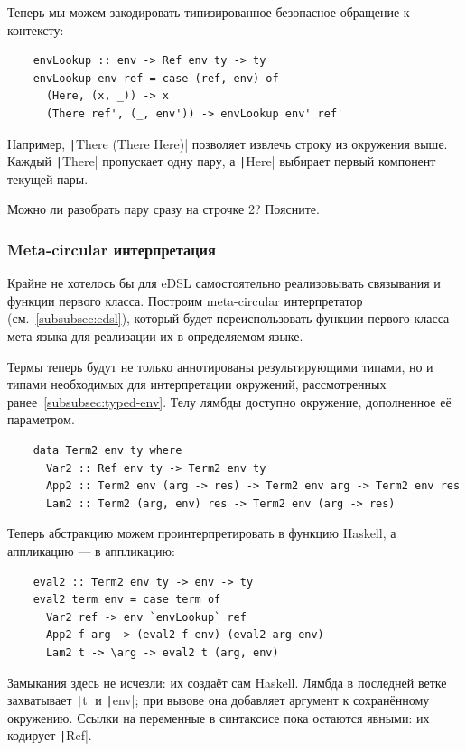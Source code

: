 Теперь мы можем закодировать типизированное безопасное обращение к контексту:
\begin{verbatim}
    envLookup :: env -> Ref env ty -> ty
    envLookup env ref = case (ref, env) of
      (Here, (x, _)) -> x
      (There ref', (_, env')) -> envLookup env' ref'
\end{verbatim}

Например, \texttt|There (There Here)| позволяет извлечь строку из окружения выше.
Каждый \texttt|There| пропускает одну пару, а \texttt|Here| выбирает первый компонент текущей пары.

\begin{task}
    Можно ли разобрать пару сразу на строчке 2?
    Поясните.
\end{task}

\subsubsection{Meta-circular интерпретация} \label{subsubsec:meta-circular-initial}

Крайне не хотелось бы для eDSL самостоятельно реализовывать связывания и функции первого класса.
Построим meta-circular интерпретатор (см.~\ref{subsubsec:edsl}), который будет переиспользовать функции первого класса мета-языка для реализации их в определяемом языке.

Термы теперь будут не только аннотированы результирующими типами, но и типами необходимых для интерпретации окружений, рассмотренных ранее~\ref{subsubsec:typed-env}.
Телу лямбды доступно окружение, дополненное её параметром.

\begin{verbatim}
    data Term2 env ty where
      Var2 :: Ref env ty -> Term2 env ty
      App2 :: Term2 env (arg -> res) -> Term2 env arg -> Term2 env res
      Lam2 :: Term2 (arg, env) res -> Term2 env (arg -> res)
\end{verbatim}

Теперь абстракцию можем проинтерпретировать в функцию Haskell, а аппликацию --- в аппликацию:
\begin{verbatim}
    eval2 :: Term2 env ty -> env -> ty
    eval2 term env = case term of
      Var2 ref -> env `envLookup` ref
      App2 f arg -> (eval2 f env) (eval2 arg env)
      Lam2 t -> \arg -> eval2 t (arg, env)
\end{verbatim}

Замыкания здесь не исчезли: их создаёт сам Haskell.
Лямбда в последней ветке захватывает \texttt|t| и \texttt|env|; при вызове она добавляет аргумент к сохранённому окружению.
Ссылки на переменные в синтаксисе пока остаются явными: их кодирует \texttt|Ref|.

